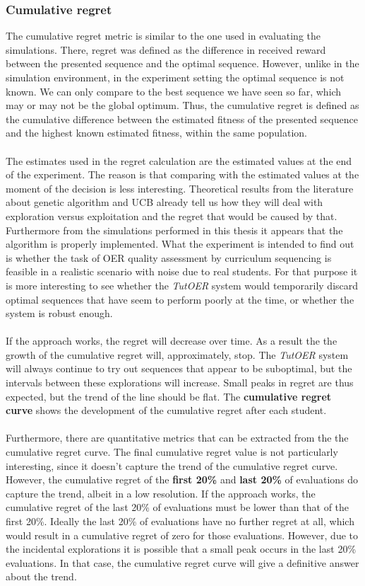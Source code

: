 \subsubsection{Cumulative regret}
The cumulative regret metric is similar to the one used in evaluating the
simulations. There, regret was defined as the difference in received reward
between the presented sequence and the optimal sequence. However, unlike in the
simulation environment, in the experiment setting the optimal sequence is not
known. We can only compare to the best sequence we have seen so far, which may
or may not be the global optimum. Thus, the cumulative regret is defined as the
cumulative difference between the estimated fitness of the presented sequence
and the highest known estimated fitness, within the same population.\\\\
\noindent
The estimates used in the regret calculation are the estimated values at the
end of the experiment. The reason is that comparing with the estimated values
at the moment of the decision is less interesting. Theoretical results from the
literature about genetic algorithm and UCB already tell us how they will deal
with exploration versus exploitation and the regret that would be caused by
that. Furthermore from the simulations performed in this thesis it appears that
the algorithm is properly implemented. What the experiment is intended to find
out is whether the task of OER quality assessment by curriculum sequencing is
feasible in a realistic scenario with noise due to real students. For that
purpose it is more interesting to see whether the \emph{TutOER} system would
temporarily discard optimal sequences that have seem to perform poorly at the
time, or whether the system is robust enough.\\\\
\noindent
If the approach works, the regret will decrease over time. As a result the
the growth of the cumulative regret will, approximately, stop. The
\emph{TutOER} system will always continue to try out sequences that appear to
be suboptimal, but the intervals between these explorations will increase.
Small peaks in regret are thus expected, but the trend of the line should be flat. The
\textbf{cumulative regret curve} shows the development of the cumulative regret
after each student.\\\\
\noindent
Furthermore, there are quantitative metrics that can be extracted from the
the cumulative regret curve. The final cumulative regret value is not
particularly interesting, since it doesn't capture the trend of the cumulative
regret curve. However, the cumulative regret of the \textbf{first 20\%} and
\textbf{last 20\%} of evaluations do capture the trend, albeit in a low
resolution. If the approach works, the cumulative regret of the last 20\% of
evaluations must be lower than that of the first 20\%. Ideally the last 20\% of
evaluations have no further regret at all, which would result in a cumulative
regret of zero for those evaluations. However, due to the incidental
explorations it is possible that a small peak occurs in the last 20\%
evaluations. In that case, the cumulative regret curve will give a definitive
answer about the trend.
